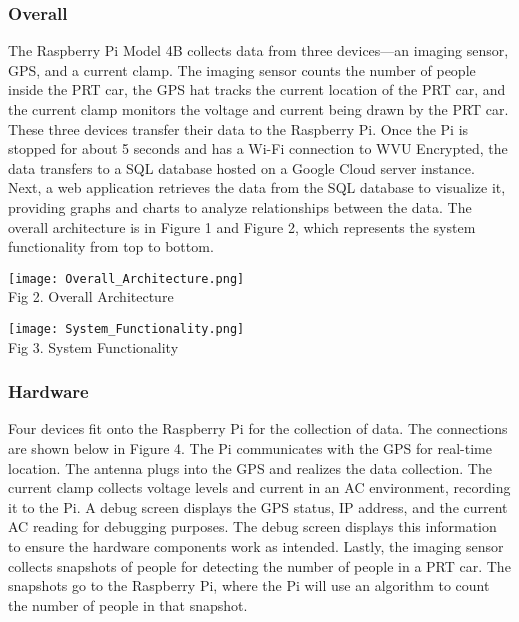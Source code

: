 \subsubsection{Overall}
The Raspberry Pi Model 4B collects data from three devices—an imaging sensor, GPS, and a current clamp. 
The imaging sensor counts the number of people inside the PRT car, the GPS hat tracks the current location of the PRT car, and the current clamp monitors the voltage and current being drawn by the PRT car. 
These three devices transfer their data to the Raspberry Pi. 
Once the Pi is stopped for about 5 seconds and has a Wi-Fi connection to WVU Encrypted, the data transfers to a SQL database hosted on a Google Cloud server instance. 
Next, a web application retrieves the data from the SQL database to visualize it, providing graphs and charts to analyze relationships between the data. 
The overall architecture is in Figure 1 and Figure 2, which represents the system functionality from top to bottom.

\begin{center}
    \texttt{[image: Overall\_Architecture.png]}\\
    Fig 2. Overall Architecture
\end{center}

\begin{center}
    \texttt{[image: System\_Functionality.png]}\\
    Fig 3. System Functionality
\end{center}

\subsubsection{Hardware}
Four devices fit onto the Raspberry Pi for the collection of data. 
The connections are shown below in Figure 4. 
The Pi communicates with the GPS for real-time location. 
The antenna plugs into the GPS and realizes the data collection. 
The current clamp collects voltage levels and current in an AC environment, recording it to the Pi. 
A debug screen displays the GPS status, IP address, and the current AC reading for debugging purposes. 
The debug screen displays this information to ensure the hardware components work as intended. 
Lastly, the imaging sensor collects snapshots of people for detecting the number of people in a PRT car. 
The snapshots go to the Raspberry Pi, where the Pi will use an algorithm to count the number of people in that snapshot.

